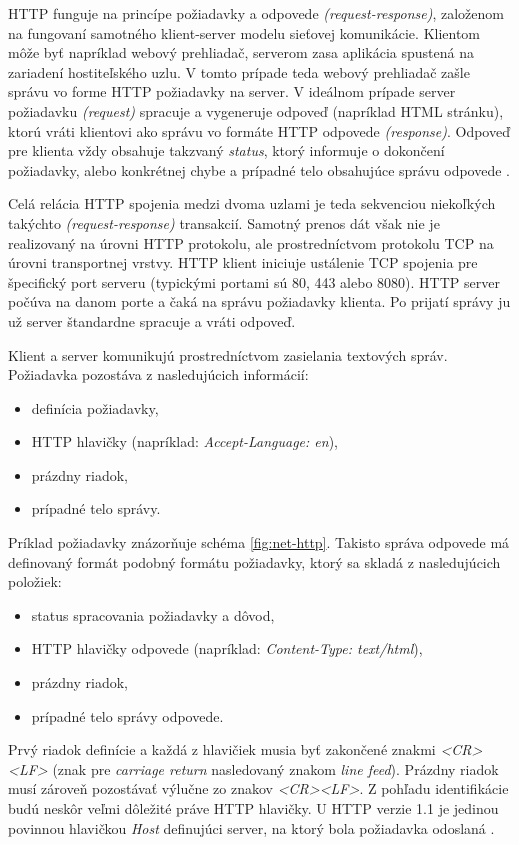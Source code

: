\documentclass[
  printed, %
  table,   %
  lof,     %
  nolot,   %
  nocover
]{fithesis3}
\begin{document}
HTTP funguje na princípe požiadavky a odpovede \textit{(request-response)},
založenom na fungovaní samotného klient-server modelu sieťovej komunikácie. Klientom môže byť
napríklad webový prehliadač, serverom zasa aplikácia spustená na zariadení
hostiteľského uzlu. V tomto prípade teda webový prehliadač zašle správu vo
forme HTTP požiadavky na server. V ideálnom prípade server požiadavku
\textit{(request)} spracuje a vygeneruje odpoveď (napríklad HTML stránku),
ktorú vráti klientovi ako správu vo formáte HTTP odpovede \textit{(response)}.
Odpoveď pre klienta vždy obsahuje takzvaný \textit{status}, ktorý informuje o
dokončení požiadavky, alebo konkrétnej chybe a prípadné telo obsahujúce správu odpovede \cite{rfc1123}.

Celá relácia HTTP spojenia medzi dvoma uzlami je teda sekvenciou niekoľkých
takýchto \textit{(request-response)} transakcií. Samotný prenos dát však nie
je realizovaný na úrovni HTTP protokolu, ale prostredníctvom protokolu TCP
na úrovni transportnej vrstvy. HTTP klient iniciuje ustálenie TCP spojenia pre
špecifický port serveru (typickými portami sú 80, 443 alebo 8080). HTTP server
počúva na danom porte a čaká na správu požiadavky klienta. Po prijatí správy ju
už server štandardne spracuje a vráti odpoveď. 

Klient a server komunikujú prostredníctvom zasielania textových správ.
Požiadavka pozostáva z nasledujúcich informácií: 
\begin{itemize}
	\item definícia požiadavky,
	\item HTTP hlavičky (napríklad: \textit{Accept-Language: en}),
	\item prázdny riadok,
	\item prípadné telo správy.
\end{itemize}
\noindent Príklad požiadavky znázorňuje schéma \ref{fig:net-http}.
Takisto správa odpovede má definovaný formát podobný formátu požiadavky, ktorý
sa skladá z nasledujúcich položiek:
\begin{itemize}
	\item status spracovania požiadavky a dôvod,
	\item HTTP hlavičky odpovede (napríklad: \textit{Content-Type: text/html}),
	\item prázdny riadok,
	\item prípadné telo správy odpovede.
\end{itemize}
Prvý riadok definície a každá z hlavičiek musia byť zakončené znakmi
\textit{<CR><LF>}
(znak pre \textit{carriage return} nasledovaný znakom \textit{line feed}).
Prázdny riadok musí zároveň pozostávať výlučne zo znakov \textit{<CR><LF>}.
Z pohľadu identifikácie budú neskôr veľmi dôležité práve HTTP hlavičky. U HTTP
verzie 1.1 je jedinou povinnou hlavičkou \textit{Host} definujúci server, na
ktorý bola požiadavka odoslaná \cite{Berners:2010:HTTP}.
\end{document}
